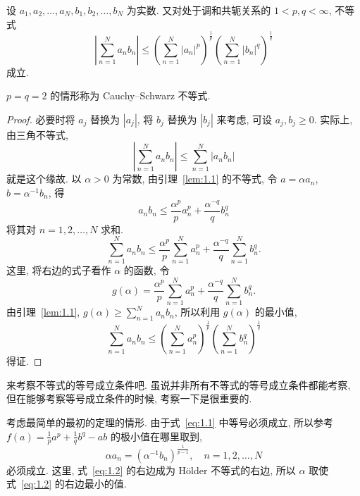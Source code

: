 \begin{theorem}\label{thm:1.2}
设 $a_{1}, a_{2}, \ldots, a_{N}, b_{1}, b_{2}, \ldots, b_{N}$ 为实数. 又对处于调和共轭关系的 $1 < p, q < \infty$, 不等式
\[
\left| \sum_{n=1}^{N} a_{n}b_{n} \right| \leq \left(\sum_{n=1}^{N} |a_{n}|^{p}\right)^{\frac{1}{p}}\left(\sum_{n=1}^{N} |b_{n}|^{q}\right)^{\frac{1}{q}}
\]
成立.
\end{theorem}

$p = q = 2$ 的情形称为 Cauchy--Schwarz 不等式.

\begin{proof}
必要时将 $a_{j}$ 替换为 $|a_{j}|$, 将 $b_{j}$ 替换为 $|b_{j}|$ 来考虑, 可设 $a_{j}, b_{j} \geq 0$. 实际上, 由三角不等式,
\[
\left| \sum_{n=1}^{N} a_{n}b_{n} \right| \leq \sum_{n=1}^{N} |a_{n}b_{n}|
\]
就是这个缘故. 以 $\alpha > 0$ 为常数, 由引理~\ref{lem:1.1} 的不等式, 令 $a = \alpha a_{n}$, $b = \alpha^{-1}b_{n}$, 得
\begin{equation}\tag{1.1}\label{eq:1.1}
a_{n}b_{n} \leq \frac{\alpha^{p}}{p}a_{n}^{p} + \frac{\alpha^{-q}}{q}b_{n}^{q}
\end{equation}
将其对 $n = 1, 2, \ldots, N$ 求和.
\begin{equation}\tag{1.2}\label{eq:1.2}
\sum_{n=1}^{N} a_{n}b_{n} \leq \frac{\alpha^{p}}{p}\sum_{n=1}^{N} a_{n}^{p} + \frac{\alpha^{-q}}{q}\sum_{n=1}^{N} b_{n}^{q}.
\end{equation}
这里, 将右边的式子看作 $\alpha$ 的函数, 令
\[
g(\alpha) = \frac{\alpha^{p}}{p}\sum_{n=1}^{N} a_{n}^{p} + \frac{\alpha^{-q}}{q}\sum_{n=1}^{N} b_{n}^{q}.
\]
由引理~\ref{lem:1.1}, $g(\alpha) \geq \sum_{n=1}^{N} a_{n}b_{n}$, 所以利用 $g(\alpha)$ 的最小值,
\[
\sum_{n=1}^{N} a_{n}b_{n} \leq \left(\sum_{n=1}^{N} a_{n}^{p}\right)^{\frac{1}{p}}\left(\sum_{n=1}^{N} b_{n}^{q}\right)^{\frac{1}{q}}
\]
得证.
\end{proof}

来考察不等式的等号成立条件吧. 虽说并非所有不等式的等号成立条件都能考察, 但在能够考察等号成立条件的时候, 考察一下是很重要的.

考虑最简单的最初的定理的情形. 由于式~\eqref{eq:1.1} 中等号必须成立, 所以参考 $f(a) = \frac{1}{p}a^{p} + \frac{1}{q}b^{q} - ab$ 的极小值在哪里取到,
\begin{equation}\tag{1.3}\label{eq:1.3}
\alpha a_{n} = \left(\alpha^{-1}b_{n}\right)^{\frac{1}{p-1}}, \quad n = 1, 2, \ldots, N
\end{equation}
必须成立. 这里, 式~\eqref{eq:1.2} 的右边成为 Hölder 不等式的右边, 所以 $\alpha$ 取使式~\eqref{eq:1.2} 的右边最小的值.


